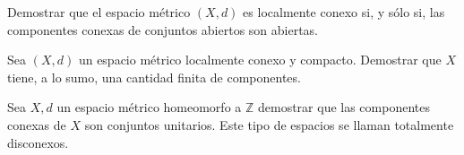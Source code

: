  


\begin{ejercicio}{} Demostrar que el espacio métrico $(X,d)$ es
localmente conexo si, y sólo si, las componentes conexas de conjuntos
abiertos son abiertas.
\end{ejercicio}

\begin{ejercicio}{} Sea $(X,d)$ un espacio métrico localmente
conexo y compacto. Demostrar que $X$ tiene, a lo sumo, una
cantidad finita de componentes.
\end{ejercicio}

\begin{ejercicio}{} Sea ${X,d}$ un espacio métrico homeomorfo a
$\mathbb{Z}$ demostrar que las componentes conexas de $X$ son
conjuntos unitarios. Este tipo de espacios se llaman totalmente
disconexos. \end{ejercicio}
